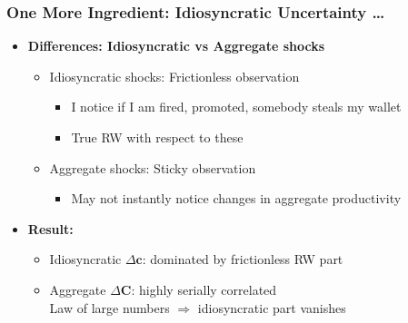 \documentclass[10pt,english,t,10pt]{beamer}
\newcommand{\jemph}[1]{{\color{StataDarkBlue}#1}}
\newcommand{\jbemph}[1]{\textbf{\color{SlideNavy}#1}}
\providecommand{\jemph}[1]{{\color{jirkasblue}#1}}
\begin{document}
\begin{frame}
\frametitle{One More Ingredient: Idiosyncratic Uncertainty \dots}

\begin{itemize}
\setlength{\itemsep}{3mm}
\item  \jbemph{Differences: Idiosyncratic vs Aggregate shocks}

\begin{itemize}
\setlength{\itemsep}{2mm}
\item  \jemph{Idiosyncratic shocks:} Frictionless observation
  \begin{itemize}
  \setlength{\itemsep}{1mm}
  \item I notice if I am fired, promoted, somebody steals my wallet
  \item  True RW with respect to these
  \end{itemize}
\item \jemph{Aggregate shocks:} Sticky observation
 \begin{itemize}
   \setlength{\itemsep}{1mm}
  \item May not instantly notice changes in aggregate productivity
  \end{itemize}
\end{itemize}

\pause
\item \jbemph{Result:}
\begin{itemize}
  \setlength{\itemsep}{1mm}
\item  \jemph{Idiosyncratic $\Delta \mathbf{c}$}: dominated by frictionless RW part
\item  \jemph{Aggregate     $\Delta \mathbf{C}$}: highly serially correlated\\
  Law of large numbers $\Rightarrow$ idiosyncratic part vanishes
\end{itemize}
\end{itemize}

\end{frame}



\end{document}
